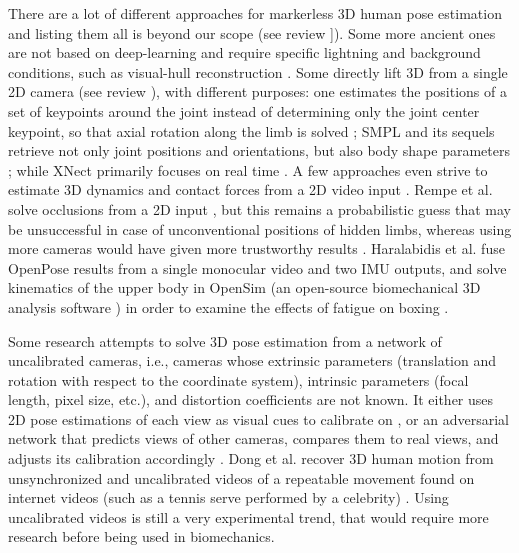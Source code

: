 There are a lot of different approaches for markerless 3D human pose estimation and listing them all is beyond our scope (see review \cite{Wang2021a}]). Some more ancient ones are not based on deep-learning and require specific lightning and background conditions, such as visual-hull reconstruction \cite{Ceseracciu2014}. Some directly lift 3D from a single 2D camera (see review \cite{Chen2020}), with different purposes: one estimates the positions of a set of keypoints around the joint instead of determining only the joint center keypoint, so that axial rotation along the limb is solved \cite{Fisch2020}; SMPL and its sequels retrieve not only joint positions and orientations, but also body shape parameters \cite{Loper2015}; while XNect primarily focuses on real time \cite{Mehta2020}. A few approaches even strive to estimate 3D dynamics and contact forces from a 2D video input \cite{Rempe2021,Li2019}. Rempe et al. solve occlusions from a 2D input \cite{Rempe2020}, but this remains a probabilistic guess that may be unsuccessful in case of unconventional positions of hidden limbs, whereas using more cameras would have given more trustworthy results . Haralabidis et al. fuse OpenPose results from a single monocular video and two IMU outputs, and solve kinematics of the upper body in OpenSim (an open-source biomechanical 3D analysis software \cite{Delp2007,Seth2018}) in order to examine the effects of fatigue on boxing \cite{Haralabidis2020}.

Some research attempts to solve 3D pose estimation from a network of uncalibrated cameras, i.e., cameras whose extrinsic parameters (translation and rotation with respect to the coordinate system), intrinsic parameters (focal length, pixel size, etc.), and distortion coefficients are not known. It either uses 2D pose estimations of each view as visual cues to calibrate on \cite{Takahashi2018}, or an adversarial network that predicts views of other cameras, compares them to real views, and adjusts its calibration accordingly \cite{Ershadi-Nasab2021}. Dong et al. recover 3D human motion from unsynchronized and uncalibrated videos of a repeatable movement found on internet videos (such as a tennis serve performed by a celebrity) \cite{Dong2020}. Using uncalibrated videos is still a very experimental trend, that would require more research before being used in biomechanics.

